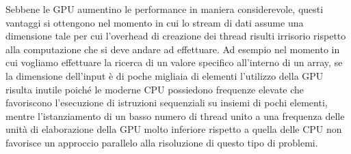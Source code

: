 Sebbene le GPU aumentino le performance in maniera considerevole, questi
vantaggi si ottengono nel momento in cui lo stream di dati assume
una dimensione tale per cui l'overhead di creazione dei thread risulti
irrisorio rispetto alla computazione che si deve andare ad effettuare.
Ad esempio nel momento in cui vogliamo effettuare la ricerca di un valore
specifico all'interno di un array, se la dimensione dell'input è di poche
migliaia di elementi l'utilizzo della GPU risulta inutile poiché
le moderne CPU possiedono frequenze elevate che favoriscono l'esecuzione
di istruzioni sequenziali su insiemi di pochi elementi, mentre l'istanziamento
di un basso numero di thread unito a una frequenza delle unità di elaborazione
della GPU molto inferiore rispetto a quella delle CPU non favorisce un
approccio parallelo alla risoluzione di questo tipo di problemi.

